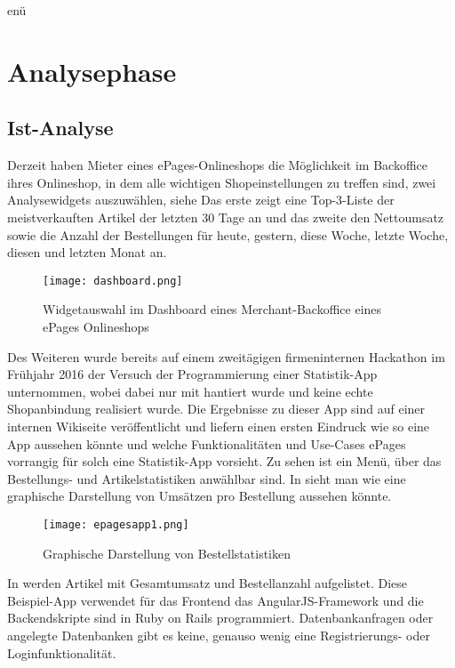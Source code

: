 enü%
\section{Analysephase} 
\label{sec:Analysephase}


\subsection{Ist-Analyse} 
\label{sec:IstAnalyse}
Derzeit haben Mieter eines ePages-Onlineshops die Möglichkeit im Backoffice ihres Onlineshop, in dem alle wichtigen Shopeinstellungen zu treffen sind, zwei Analysewidgets auszuwählen, siehe  Das erste zeigt eine Top-3-Liste der meistverkauften Artikel der letzten 30 Tage an und das zweite den Nettoumsatz sowie die Anzahl der Bestellungen für heute, gestern, diese Woche, letzte Woche, diesen und letzten Monat an.
\begin{figure}[htb]
\begin{center}
\texttt{[image: dashboard.png]}
\caption{Widgetauswahl im Dashboard eines Merchant-Backoffice eines ePages Onlineshops}
\label{fig:dashboard}
\end{center}
\end{figure}
Des Weiteren wurde bereits auf einem zweitägigen firmeninternen Hackathon im Frühjahr 2016 der Versuch der Programmierung einer Statistik-App unternommen, wobei dabei nur mit   hantiert wurde und keine echte Shopanbindung realisiert wurde. Die Ergebnisse zu dieser App sind auf einer internen Wikiseite veröffentlicht und liefern einen ersten Eindruck wie so eine App aussehen könnte und welche Funktionalitäten und Use-Cases ePages vorrangig für solch eine Statistik-App vorsieht. Zu sehen ist ein Menü, über das Bestellungs- und Artikelstatistiken anwählbar sind. In  sieht man wie eine graphische Darstellung von Umsätzen pro Bestellung aussehen könnte.

\begin{figure}[htb]
\begin{center}
\texttt{[image: epagesapp1.png]}
\caption{Graphische Darstellung von Bestellstatistiken}
\label{fig:order}
\end{center}
\end{figure}

\newpage

In  werden Artikel mit Gesamtumsatz und Bestellanzahl aufgelistet. Diese Beispiel-App verwendet für das Frontend das AngularJS-Framework und die Backendskripte sind in Ruby on Rails programmiert. Datenbankanfragen oder angelegte Datenbanken gibt es keine, genauso wenig eine Registrierungs- oder Loginfunktionalität.


